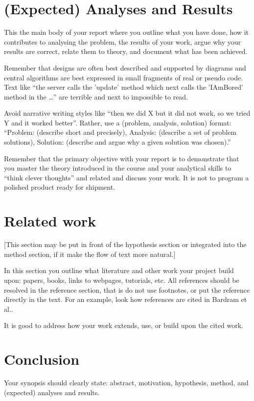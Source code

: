 \documentclass[a4paper]{article}
\begin{document}
\section{(Expected) Analyses and Results}

This the main body of your report where you outline what you have
done, how it contributes to analysing the problem, the results of your
work, argue why your results are correct, relate them to theory, and
document what has been achieved.

Remember that designs are often best described and supported by
diagrams and central algorithms are best expressed in small fragments
of real or pseudo code. Text like ``the server calls the 'update'
method which next calls the 'IAmBored' method in the \ldots'' are
terrible and next to impossible to read.

Avoid narrative writing styles like ``then we did X but it did not work, so
we tried Y and it worked better''. Rather, use a (problem, analysis,
solution) format: ``Problem: (describe short and precisely), Analysis:
(describe a set of problem solutions), Solution: (describe and argue
why a given solution was chosen).''

Remember that the primary objective with your report is to demonstrate
that you master the theory introduced in the course and your
analytical skills to ``think clever thoughts'' and related and discuss
your work. It is not to program a polished product ready for shipment.


\section{Related work}

[This section may be put in front of the hypothesis section or
  integrated into the method section, if it make the flow of text more
  natural.]

In this section you outline what literature and other work your
project build upon: papers, books, links to webpages, tutorials,
etc. All references should be resolved in the reference section, that
is do not use footnotes, or put the reference directly in the
text. For an example, look how references are cited in Bardram et
al.\cite{bardram}.

It is good to address how your work extends, use, or build upon the
cited work. 

\section{Conclusion}

Your synopsis should clearly state: abstract, motivation, hypothesis,
method, and (expected) analyses and results.






\end{document}
